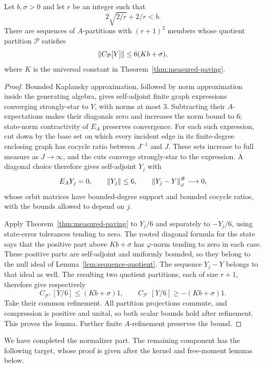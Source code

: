\begin{lemma}\label{exp:normalizer-paving}
Let $b,\sigma>0$ and let $r$ be an integer such that
\[
 2\sqrt{2/r}+2/r<b.
\]
There are sequences of $A$-partitions with $(r+1)^2$ members whose
quotient partition $\mathcal P$ satisfies
\begin{equation}\label{exp:normalizer-bound}
 \left\lVert C_{\mathcal P}[Y]\right\rVert\leq6(Kb+\sigma),
\end{equation}
where $K$ is the universal constant in
Theorem~\ref{thm:measured-paving}.
\end{lemma}

\begin{proof}
Bounded Kaplansky approximation, followed by norm approximation inside
the generating algebra, gives self-adjoint finite graph expressions
converging strongly-star to $Y$, with norms at most $3$. Subtracting
their $A$-expectations makes their diagonals zero and increases the norm
bound to $6$; state-norm contractivity of $E_A$ preserves convergence.
For each such expression, cut down by the base set on which every
incident edge in its finite-degree enclosing graph has cocycle ratio
between $J^{-1}$ and $J$. These sets increase to full measure as
$J\to\infty$, and the cuts converge strongly-star to the expression.
A diagonal choice therefore gives self-adjoint $Y_j$ with
\[
 E_AY_j=0,\qquad \left\lVert Y_j\right\rVert\leq6,\qquad
 \left\lVert Y_j-Y\right\rVert_\varphi^\#\longrightarrow0,
\]
whose orbit matrices have bounded-degree support and bounded cocycle
ratios, with the bounds allowed to depend on $j$.

Apply Theorem~\ref{thm:measured-paving} to $Y_j/6$ and separately to
$-Y_j/6$, using state-error tolerances tending to zero. The rooted
diagonal formula for the state says that the positive part above
$Kb+\sigma$ has $\varphi$-norm tending to zero in each case. These
positive parts are self-adjoint and uniformly bounded, so they belong
to the null ideal of Lemma~\ref{lem:sequence-quotient}. The sequence
$Y_j-Y$ belongs to that ideal as well. The resulting two quotient
partitions, each of size $r+1$, therefore give respectively
\[
 C_{\mathcal P^+}[Y/6]\leq(Kb+\sigma)1,
 \qquad
 C_{\mathcal P^-}[Y/6]\geq-(Kb+\sigma)1.
\]
Take their common refinement. All partition projections commute, and
compression is positive and unital, so both scalar bounds hold after
refinement. This proves the lemma. Further finite $A$-refinement
preserves the bound.
\end{proof}

We have completed the normalizer part. The remaining component has the
following target, whose proof is given after the kernel and free-moment
lemmas below.

